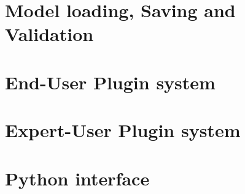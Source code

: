 \documentclass[a4paper,twoside,openright,makeidx,12pt]{book}
\begin{document}
\chapter{Model loading, Saving and Validation}
\label{Sec:DDD-ModelLoading}






\newpage
\chapter{End-User Plugin system}
\label{Sec:DDD-EndUserPluginsystem}

\newpage
\chapter{Expert-User Plugin system}
\label{Sec:DDD-ExpertUser-Pluginsystem}


\newpage
\chapter{Python interface}
\label{Sec:DDD-pyInterface}

%
\end{document}
